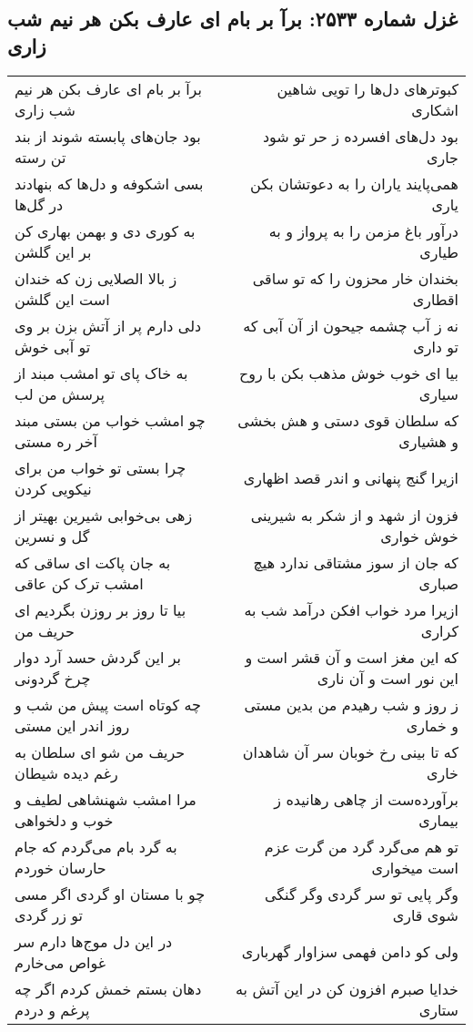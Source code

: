 \begin{center}
\section*{غزل شماره ۲۵۳۳: برآ بر بام ای عارف بکن هر نیم شب زاری}
\label{sec:2533}
\begin{longtable}{l p{0.5cm} r}
برآ بر بام ای عارف بکن هر نیم شب زاری
&&
کبوترهای دل‌ها را تویی شاهین اشکاری
\\
بود جان‌های پابسته شوند از بند تن رسته
&&
بود دل‌های افسرده ز حر تو شود جاری
\\
بسی اشکوفه و دل‌ها که بنهادند در گل‌ها
&&
همی‌پایند یاران را به دعوتشان بکن یاری
\\
به کوری دی و بهمن بهاری کن بر این گلشن
&&
درآور باغ مزمن را به پرواز و به طیاری
\\
ز بالا الصلایی زن که خندان است این گلشن
&&
بخندان خار محزون را که تو ساقی اقطاری
\\
دلی دارم پر از آتش بزن بر وی تو آبی خوش
&&
نه ز آب چشمه جیحون از آن آبی که تو داری
\\
به خاک پای تو امشب مبند از پرسش من لب
&&
بیا ای خوب خوش مذهب بکن با روح سیاری
\\
چو امشب خواب من بستی مبند آخر ره مستی
&&
که سلطان قوی دستی و هش بخشی و هشیاری
\\
چرا بستی تو خواب من برای نیکویی کردن
&&
ازیرا گنج پنهانی و اندر قصد اظهاری
\\
زهی بی‌خوابی شیرین بهیتر از گل و نسرین
&&
فزون از شهد و از شکر به شیرینی خوش خواری
\\
به جان پاکت ای ساقی که امشب ترک کن عاقی
&&
که جان از سوز مشتاقی ندارد هیچ صباری
\\
بیا تا روز بر روزن بگردیم ای حریف من
&&
ازیرا مرد خواب افکن درآمد شب به کراری
\\
بر این گردش حسد آرد دوار چرخ گردونی
&&
که این مغز است و آن قشر است و این نور است و آن ناری
\\
چه کوتاه است پیش من شب و روز اندر این مستی
&&
ز روز و شب رهیدم من بدین مستی و خماری
\\
حریف من شو ای سلطان به رغم دیده شیطان
&&
که تا بینی رخ خوبان سر آن شاهدان خاری
\\
مرا امشب شهنشاهی لطیف و خوب و دلخواهی
&&
برآورده‌ست از چاهی رهانیده ز بیماری
\\
به گرد بام می‌گردم که جام حارسان خوردم
&&
تو هم می‌گرد گرد من گرت عزم است میخواری
\\
چو با مستان او گردی اگر مسی تو زر گردی
&&
وگر پایی تو سر گردی وگر گنگی شوی قاری
\\
در این دل موج‌ها دارم سر غواص می‌خارم
&&
ولی کو دامن فهمی سزاوار گهرباری
\\
دهان بستم خمش کردم اگر چه پرغم و دردم
&&
خدایا صبرم افزون کن در این آتش به ستاری
\\
\end{longtable}
\end{center}
